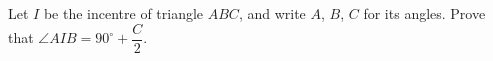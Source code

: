 Let $I$ be the incentre of triangle $ABC$, and write $A$, $B$, $C$ for its angles. Prove that $\angle AIB=90^\circ+\dfrac C2$.
